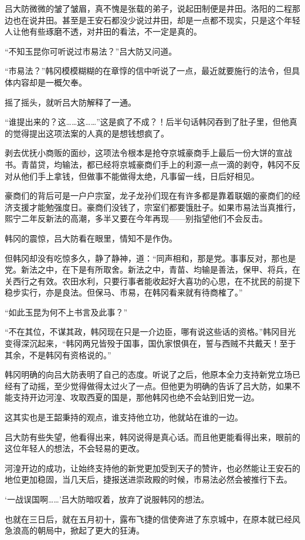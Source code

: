 吕大防微微的皱了皱眉，真不愧是张载的弟子，说起田制便是井田。洛阳的二程那边也在说井田。甚至是王安石都没少说过井田，却是一点都不现实，只是这个年轻人让他有些琢磨不透，对井田的看法，不一定是真的。

“不知玉昆你可听说过市易法？”吕大防又问道。

“市易法？”韩冈模模糊糊的在章惇的信中听说了一点，最近就要施行的法令，但具体内容却是一概欠奉。

摇了摇头，就听吕大防解释了一通。

“谁提出来的？这……这……”这是疯了不成？！后半句话韩冈吞到了肚子里，但他真的觉得提出这项法案的人真的是想钱想疯了。

剥去优抚小商贩的面纱，这项法令根本是抢夺京城豪商手上最后一份大饼的宣战书。青苗贷，均输法，都已经将京城豪商们手上的利源一点一滴的剥夺，韩冈不反对从他们手上拿钱，但做事不能做得太绝，凡事留一线，日后好相见。

豪商们的背后可是一户户宗室，龙子龙孙们现在有许多都是靠着联姻的豪商们的经济支援才能勉强度日。豪商们没钱了，宗室们都要饿肚子。如果市易法当真推行，熙宁二年反新法的高潮，多半又要在今年再现——别指望他们不会反击。

韩冈的震惊，吕大防看在眼里，情知不是作伪。

但韩冈却没有吃惊多久，静了静神，道：“同声相和，那是党。事事反对，那也是党。新法之中，在下是有所取舍。新法之中，青苗、均输是善法，保甲、将兵，在关西行之有效。农田水利，只要行事者能收起好大喜功的心思，在不扰民的前提下稳步实行，亦是良法。但保马、市易，在韩冈看来就有待商榷了。”

“如此玉昆为何不上书言及此事？”

“不在其位，不谋其政，韩冈现在只是一介边臣，哪有说这些话的资格。”韩冈目光变得深沉起来，“韩冈两兄皆殁于国事，国仇家恨俱在，誓与西贼不共戴天！至于其余，不是韩冈有资格说的。”

韩冈明确的向吕大防表明了自己的态度。听说了之后，他原本全力支持新党立场已经有了动摇，至少觉得做得太过火了一点。但他更为明确的告诉了吕大防，如果不能支持开边河湟、攻取西夏的国是，那他韩冈也绝不会站到旧党一边。

这其实也是王韶秉持的观点，谁支持他立功，他就站在谁的一边。

吕大防有些失望，他看得出来，韩冈说得是真心话。而且他更能看得出来，眼前的这位年轻人的想法，不会轻易的更改。

河湟开边的成功，让始终支持他的新党更加受到天子的赞许，也必然能让王安石的地位更加稳固，当几天后，捷报送进崇政殿的时候，市易法必然会被推行下去。

‘一战误国啊……’吕大防暗叹着，放弃了说服韩冈的想法。

也就在三日后，就在五月初十，露布飞捷的信使奔进了东京城中，在原本就已经风急浪高的朝局中，掀起了更大的狂涛。

